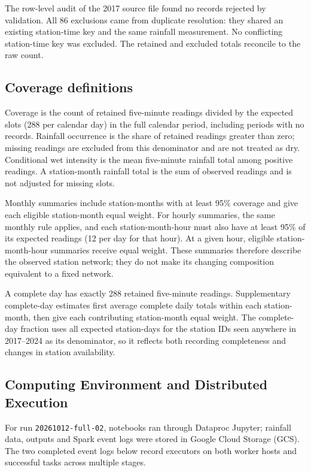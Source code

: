 \documentclass[11pt,a4paper]{article}
\newcommand{\runid}{20261012-full-02}
\begin{document}
The row-level audit of the 2017 source file found no records rejected by
validation. All 86 exclusions came from duplicate resolution: they shared an
existing station-time key and the same rainfall measurement. No conflicting
station-time key was excluded. The retained and excluded totals reconcile to
the raw count.

\subsection{Coverage definitions}
Coverage is the count of retained five-minute readings divided by the expected
slots (288 per calendar day) in the full calendar period, including periods
with no records. Rainfall
occurrence is the share of retained readings greater than zero; missing
readings are excluded from this denominator and are not treated as dry.
Conditional wet intensity is the mean five-minute rainfall total among
positive readings. A
station-month rainfall total is the sum of observed readings and is not
adjusted for missing slots.

Monthly summaries include station-months with at least 95\% coverage and give
each eligible station-month equal weight. For hourly summaries, the same
monthly rule applies, and each station-month-hour must also have at least 95\%
of its expected readings (12 per day for that hour). At a given hour, eligible
station-month-hour summaries receive equal weight. These summaries therefore
describe the observed station network; they do not make its changing
composition equivalent to a fixed network.

A complete day has exactly 288 retained five-minute readings. Supplementary
complete-day estimates first average complete daily totals within each
station-month, then give each contributing station-month equal weight. The
complete-day fraction uses all expected station-days for the station IDs seen
anywhere in 2017--2024 as its denominator, so it reflects both recording
completeness and changes in station availability.

\subsection{Computing Environment and Distributed Execution}
For run \texttt{\runid}, notebooks ran through Dataproc Jupyter; rainfall data,
outputs and Spark event logs were stored in Google Cloud Storage (GCS). The two
completed event logs below record executors on both worker hosts and successful
tasks across multiple stages.
\end{document}
